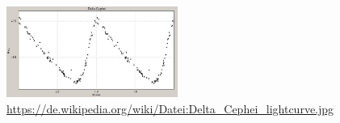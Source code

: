 	\begin{figure}[h]
	\includegraphics[width = 0.5\textwidth]{abbildungen/Cephei}
	\caption{\tiny\url{https://de.wikipedia.org/wiki/Datei:Delta_Cephei_lightcurve.jpg}}
\end{figure}